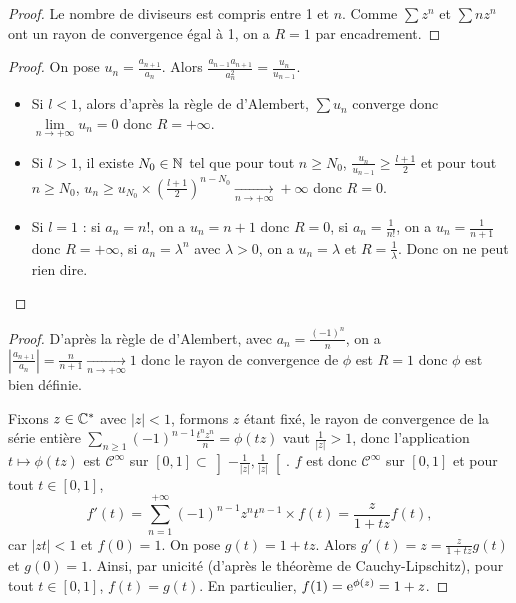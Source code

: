 \documentclass[12pt]{article}
\begin{document}
\begin{proof}
    Le nombre de diviseurs est compris entre 1 et $n$. Comme $\sum z^{n}$ et $\sum nz^{n}$ ont un rayon de convergence égal à 1, on a $R=1$ par encadrement.
\end{proof}

\begin{proof}
    On pose $u_n=\frac{a_{n+1}}{a_{n}}$. Alors $\frac{a_{n-1}a_{n+1}}{a_{n}^{2}}=\frac{u_{n}}{u_{n-1}}$. 
    \begin{itemize}
        \item Si $l<1$, alors d'après la règle de d'Alembert, $\sum u_{n}$ converge donc $\lim\limits_{n\to+\infty}u_{n}=0$ donc $R=+\infty$.
        \item Si $l>1$, il existe $N_{0}\in\mathbb{N}$ tel que pour tout $n\geqslant N_{0}$, $\frac{u_{n}}{u_{n-1}}\geqslant\frac{l+1}{2}$ et pour tout $n\geqslant N_{0}$, $u_{n}\geqslant u_{N_{0}}\times\left(\frac{l+1}{2}\right)^{n-N_{0}}\xrightarrow[n\to+\infty]{}+\infty$ donc $R=0$.
        \item Si $l=1$ : si $a_n=n!$, on a $u_n=n+1$ donc $R=0$, si $a_n=\frac{1}{n!}$, on a $u_n=\frac{1}{n+1}$ donc $R=+\infty$, si $a_n=\lambda^{n}$ avec $\lambda>0$, on a $u_n=\lambda$ et $R=\frac{1}{\lambda}$. Donc on ne peut rien dire.
    \end{itemize}
\end{proof}

\begin{proof}
    D'après la règle de d'Alembert, avec $a_{n}=\frac{(-1)^{n}}{n}$, on a $\left\lvert \frac{a_{n+1}}{a_{n}}\right\rvert=\frac{n}{n+1}\xrightarrow[n\to+\infty]{}1$ donc le rayon de convergence de $\phi$ est $R=1$ donc $\phi$ est bien définie.

    Fixons $z\in\mathbb{C}^{*}$ avec $\left\lvert z\right\rvert<1$, formons 
    $z$ étant fixé, le rayon de convergence de la série entière $\sum_{n\geqslant1}(-1)^{n-1}\frac{t^{n}z^{n}}{n}=\phi(tz)$ vaut $\frac{1}{\left\lvert z\right\rvert}>1$, donc l'application $t\mapsto\phi(tz)$ est $\mathcal{C}^{\infty}$ sur $[0,1]\subset\left]-\frac{1}{\left\lvert z\right\rvert},\frac{1}{\left\lvert z\right\rvert}\right[$. $f$ est donc $\mathcal{C}^{\infty}$ sur $[0,1]$ et pour tout $t\in[0,1]$,
    \begin{equation}
        f'(t)=\sum_{n=1}^{+\infty}(-1)^{n-1}z^{n}t^{n-1}\times f(t)=\frac{z}{1+tz}f(t),
    \end{equation}
    car $\left\lvert zt\right\rvert<1$ et $f(0)=1$. On pose $g(t)=1+tz$. Alors $g'(t)=z=\frac{z}{1+tz}g(t)$ et $g(0)=1$. Ainsi, par unicité (d'après le théorème de Cauchy-Lipschitz), pour tout $t\in[0,1]$, $f(t)=g(t)$. En particulier, $f(1)=\mathrm{e}^{\phi(z)}=1+z$.
\end{proof}
\end{document}
